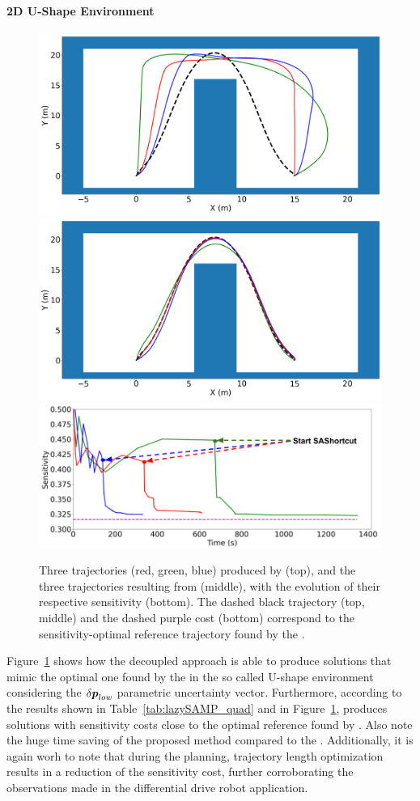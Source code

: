\paragraph{2D U-Shape Environment} 

\begin{figure}[htp]
    \centering
    \includegraphics[width=0.7\linewidth]{figures/samp/U_shape_3in1_before.png}
    \includegraphics[width=0.7\linewidth]{figures/samp/U_shape_3in1_after.png}
    \includegraphics[width=0.7\linewidth]{figures/samp/U_shape_3in1_sensi.png}
    \caption{Three trajectories (red, green, blue) produced by  (top), and the three trajectories resulting from  (middle), with the evolution of their respective sensitivity (bottom). 
    The dashed black trajectory (top, middle) and the dashed purple cost (bottom) correspond to the sensitivity-optimal reference trajectory found by the .}
    \label{fig:U_shape}
\end{figure}

Figure~\ref{fig:U_shape} shows how the decoupled approach is able to produce solutions that mimic the optimal one found by the  in the so called U-shape environment considering the $\delta\boldsymbol{p}_{low}$ parametric uncertainty vector.
Furthermore, according to the results shown in Table~\ref{tab:lazySAMP_quad} and in Figure~\ref{fig:U_shape},  produces solutions with sensitivity costs close to the optimal reference found by . 
Also note the huge time saving of the proposed method compared to the .
Additionally, it is again worh to note that during the  planning, trajectory length optimization results in a reduction of the sensitivity cost, further corroborating the observations made in the differential drive robot application.

